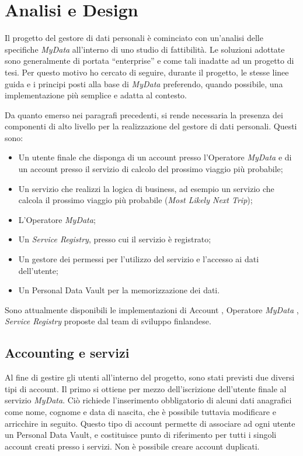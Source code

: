 \chapter{Analisi e Design}
\label{capitolo4}
\thispagestyle{empty}

\noindent Il progetto del gestore di dati personali \`e cominciato con un’analisi delle specifiche \textit{MyData} all’interno di uno studio di fattibilit\`a. Le soluzioni adottate sono generalmente di portata “enterprise” e come tali inadatte ad un progetto di tesi. Per questo motivo ho cercato di seguire, durante il progetto, le stesse linee guida e i principi posti alla base di \textit{MyData} preferendo, quando possibile, una implementazione pi\`u semplice e adatta al contesto.

Da quanto emerso nei paragrafi precedenti, si rende necessaria la presenza dei componenti di alto livello per la realizzazione del gestore di dati personali. Questi sono:
\begin{itemize}
	\item Un utente finale che disponga di un account presso l’Operatore \textit{MyData} e di un account presso il servizio di calcolo del prossimo viaggio pi\`u probabile;
	\item Un servizio che realizzi la logica di business, ad esempio un servizio che calcola il prossimo viaggio pi\`u probabile (\textit{Most Likely Next Trip});
	\item L’Operatore \textit{MyData};
	\item Un \textit{Service Registry}, presso cui il servizio \`e registrato;
	\item Un gestore dei permessi per l’utilizzo del servizio e l’accesso ai dati dell’utente;
	\item Un Personal Data Vault per la memorizzazione dei dati.
\end{itemize}

Sono attualmente disponibili le implementazioni  di Account \cite{githubmydataaccount}, Operatore \textit{MyData} \cite{githubmydataoperator}, \textit{Service Registry} \cite{githubmydataserviceregistry} proposte dal team di sviluppo finlandese.

\section{Accounting e servizi}
Al fine di gestire gli utenti all’interno del progetto, sono stati previsti due diversi tipi di account. Il primo si ottiene per mezzo dell’iscrizione dell’utente finale al servizio \textit{MyData}. Ci\`o richiede l’inserimento obbligatorio di alcuni dati anagrafici come nome, cognome e data di nascita, che \`e possibile tuttavia modificare e arricchire in seguito. Questo tipo di account permette di associare ad ogni utente un Personal Data Vault, e costituisce punto di riferimento per tutti i singoli account creati presso i servizi. Non \`e possibile creare account duplicati.

